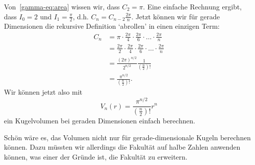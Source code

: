 Von~\eqref{gamma-eq:area} wissen wir, dass $C_2 = \pi$.
Eine einfache Rechnung ergibt, dass $I_0 = 2$ und $I_1 = \frac{\pi}{2}$, d.h. $C_n = C_{n-2} \frac{2 \pi}{n}$.
Jetzt können wir für gerade Dimensionen die rekursive Definition `abrollen' in einen einzigen
Term:
\begin{equation}
\label{gamma-eq:nonrecursive-constant}
\begin{split}
        C_n &= \pi \cdot \frac{2 \pi}{4} \cdot \frac{2 \pi}{6} \cdot \ldots \cdot \frac{2 \pi}{n} \\
            &= \frac{2 \pi}{2} \cdot \frac{2 \pi}{4} \cdot \frac{2 \pi}{6} \cdot \ldots \cdot \frac{2 \pi}{n} \\
            &= \frac{(2 \pi)^{n/2}}{2^{n/2}} \frac{1}{\left(\frac{n}{2}\right)!} \\
            &= \frac{\pi^{n/2}}{\left(\frac{n}{2}\right)!}.
\end{split}
\end{equation}
Wir können jetzt also mit
\begin{equation}
\label{gamma-eq:n-sphere-volume-even}
    V_n(r) = \frac{\pi^{n/2}}{(\frac{n}{2})!}  r^n
\end{equation}
ein Kugelvolumen bei geraden Dimensionen einfach berechnen.

Schön wäre es, das Volumen nicht nur für gerade-dimensionale Kugeln berechnen können.
Dazu müssten wir allerdings die Fakultät auf halbe Zahlen anwenden können, was einer der Gründe ist, die Fakultät zu erweitern.
